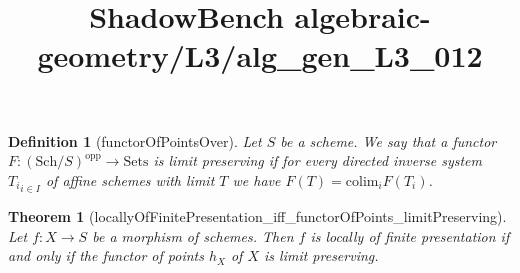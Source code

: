 \documentclass{article}
\title{ShadowBench algebraic-geometry/L3/alg\_gen\_L3\_012}
\newtheorem{theorem}{Theorem}
\newtheorem{definition}{Definition}
\begin{document}
\maketitle

\begin{definition}[functorOfPointsOver]
     Let $S$ be a scheme. We say that a functor $F:(\mathrm{Sch}/S)^{\mathrm{opp}} \to \mathrm{Sets}$ is limit preserving if for every directed inverse system ${T_i}_{i \in I}$ of affine schemes with limit $T$ we have $F(T)=\mathrm{colim}_i F(T_i)$.
\end{definition}
\begin{theorem}[locallyOfFinitePresentation_iff_functorOfPoints_limitPreserving]
    Let $f:X \to S$ be a morphism of schemes. Then $f$ is locally of finite presentation if and only if the functor of points $h_X$ of $X$ is limit preserving.
\end{theorem}
\end{document}
